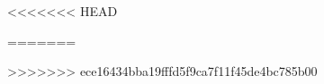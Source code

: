 <<<<<<< HEAD













=======
% 
% 
% 
% 
% 
% 
% 
% 
% 
% 
% 

>>>>>>> ece16434bba19fffd5f9ca7f11f45de4bc785b00
